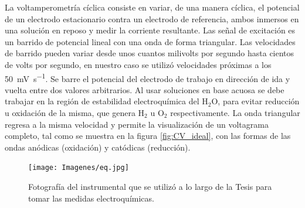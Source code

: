 	 La voltamperometría cíclica consiste en variar, de una manera cíclica, el potencial de un electrodo estacionario contra un electrodo de referencia, ambos inmersos en una solución en reposo y medir la corriente resultante. Las señal de excitación es un barrido de potencial lineal con una onda de forma triangular. Las velocidades de barrido pueden variar desde unos cuantos milivolts por segundo hasta cientos de volts por segundo, en nuestro caso se utilizó velocidades próximas a los \SI{50}{\milli\volt.\second^{-1}}. Se barre el potencial del electrodo de trabajo en dirección de ida y vuelta entre dos valores arbitrarios. Al usar soluciones en base acuosa se debe trabajar en la región de estabilidad electroquímica del H$_2$O, para evitar reducción u oxidación de la misma, que genera H$_2$ u O$_2$ respectivamente. La onda triangular regresa a la misma velocidad y permite la visualización de un voltagrama completo, tal como se muestra en la figura \ref{fig:CV_ideal}, con las formas de las ondas anódicas (oxidación) y catódicas (reducción). 

	 		\begin{figure}[ht!]
			 		  \begin{center}
			 		  \texttt{[image: Imagenes/eq.jpg]}
			 		  \caption[Equipo para realizar la medidas electroquímica\index{electroquimico}s]{Fotografía del instrumental que se utilizó a lo largo de la Tesis para tomar las medidas electroquímica\index{electroquimico}s.}
			 		  \label{esq:eq}
			 		  \end{center}
			 		  \end{figure}		
	
